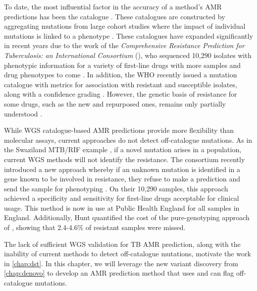 To date, the most influential factor in the accuracy of a method's AMR predictions has been the catalogue \cite{hunt2019}. These catalogues are constructed by aggregating mutations from large cohort studies where the impact of individual mutations is linked to a phenotype \cite{hunt2019,miotto2017,phelan2019}. These catalogues have expanded significantly in recent years due to the work of the \emph{Comprehensive Resistance Prediction for Tuberculosis: an International Consortium} (\cryptic{}), who sequenced 10,290 isolates with phenotypic information for a variety of first-line drugs \cite{cryptic2018,cryptic2021data} with more samples and drug phenotypes to come \cite{cryptic2021data}. In addition, the WHO recently issued a mutation catalogue with metrics for association with resistant and susceptible isolates, along with a confidence grading \cite{whopanel2021}. However, the genetic basis of resistance for some drugs, such as the new and repurposed ones, remains only partially understood \cite{Kadura2020}.

\noindent
While WGS catalogue-based AMR predictions provide more flexibility than molecular assays, current approaches do not detect off-catalogue mutations. As in the Swaziland \xpert{} MTB/RIF example \cite{Sanchez2015}, if a novel mutation arises in a population, current WGS methods will not identify the resistance. The \cryptic{} consortium recently introduced a new approach whereby if an unknown mutation is identified in a gene known to be involved in resistance, they refuse to make a prediction and send the sample for phenotyping \cite{cryptic2018}. On their 10,290 samples, this approach achieved a specificity and sensitivity for first-line drugs acceptable for clinical usage. This method is now in use at Public Health England for all \mtb{} samples in England. Additionally, Hunt \etal{} quantified the cost of the pure-genotyping approach of \mykrobe{}, showing that 2.4-4.6\% of resistant samples were missed. 

\noindent
The lack of sufficient \ont{} WGS validation for TB AMR prediction, along with the inability of current methods to detect off-catalogue mutations, motivate the work in \autoref{chap:dst}. In this chapter, we will leverage the new \denovo{} variant discovery from \autoref{chap:denovo} to develop an AMR prediction method that uses \pandora{} and can flag off-catalogue mutations.

